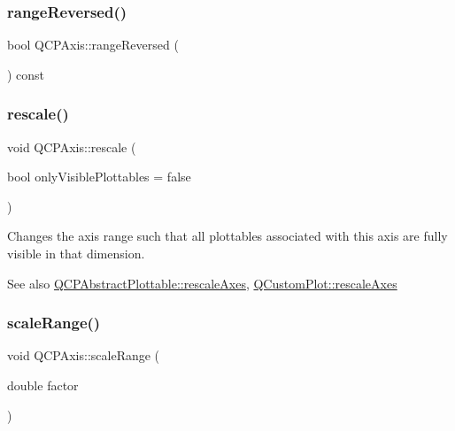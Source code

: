 \subsubsection{\texorpdfstring{rangeReversed()}{rangeReversed()}}
{\footnotesize\ttfamily bool Q\+C\+P\+Axis\+::range\+Reversed (\begin{DoxyParamCaption}{ }\end{DoxyParamCaption}) const\hspace{0.3cm}{\ttfamily [inline]}}

\mbox{\label{class_q_c_p_axis_a499345f02ebce4b23d8ccec96e58daa9}} 
\subsubsection{\texorpdfstring{rescale()}{rescale()}}
{\footnotesize\ttfamily void Q\+C\+P\+Axis\+::rescale (\begin{DoxyParamCaption}\item[{bool}]{only\+Visible\+Plottables = {\ttfamily false} }\end{DoxyParamCaption})}

Changes the axis range such that all plottables associated with this axis are fully visible in that dimension.

\begin{DoxySeeAlso}{See also}
\mbox{\hyperlink{class_q_c_p_abstract_plottable_a1491c4a606bccd2d09e65e11b79eb882}{Q\+C\+P\+Abstract\+Plottable\+::rescale\+Axes}}, \mbox{\hyperlink{class_q_custom_plot_ad86528f2cee6c7e446dea4a6e8839935}{Q\+Custom\+Plot\+::rescale\+Axes}} 
\end{DoxySeeAlso}
\mbox{\label{class_q_c_p_axis_a31d18ddf3a4f21ceb077db8ae5b69856}} 
\subsubsection{\texorpdfstring{scaleRange()}{scaleRange()}\hspace{0.1cm}{\footnotesize\ttfamily [1/2]}}
{\footnotesize\ttfamily void Q\+C\+P\+Axis\+::scale\+Range (\begin{DoxyParamCaption}\item[{double}]{factor }\end{DoxyParamCaption})}

